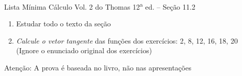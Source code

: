 \documentclass[fleqn,utf8,aspectratio=169,12pt]{beamer}
\begin{document}
\begin{frame}{Lista Mínima}
  Cálculo Vol. 2 do Thomas 12\textsuperscript{a} ed. -- Seção 11.2
  \begin{enumerate}
    \item Estudar todo o texto da seção
    \item \emph{Calcule o vetor tangente}
          das funções dos exercícios: 2, 8, 12, 16, 18, 20\\
          (Ignore o enunciado original dos exercícios)
  \end{enumerate}

  \vfill
  Atenção: A prova é baseada no livro, não nas apresentações
\end{frame}

\end{document}
